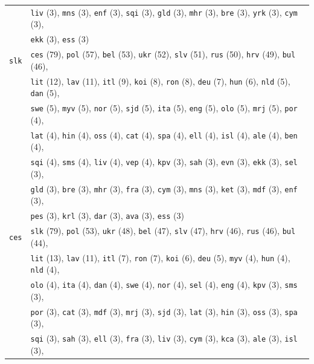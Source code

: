 \begin{center}
\begin{longtable}{ll}
 & \texttt{liv} (3), \texttt{mns} (3), \texttt{enf} (3), \texttt{sqi} (3), \texttt{gld} (3), \texttt{mhr} (3), \texttt{bre} (3), \texttt{yrk} (3), \texttt{cym} (3),\\
 & \texttt{ekk} (3), \texttt{ess} (3) \\
\texttt{slk} & \texttt{ces} (79), \texttt{pol} (57), \texttt{bel} (53), \texttt{ukr} (52), \texttt{slv} (51), \texttt{rus} (50), \texttt{hrv} (49), \texttt{bul} (46),\\
 & \texttt{lit} (12), \texttt{lav} (11), \texttt{itl} (9), \texttt{koi} (8), \texttt{ron} (8), \texttt{deu} (7), \texttt{hun} (6), \texttt{nld} (5), \texttt{dan} (5),\\
 & \texttt{swe} (5), \texttt{myv} (5), \texttt{nor} (5), \texttt{sjd} (5), \texttt{ita} (5), \texttt{eng} (5), \texttt{olo} (5), \texttt{mrj} (5), \texttt{por} (4),\\
 & \texttt{lat} (4), \texttt{hin} (4), \texttt{oss} (4), \texttt{cat} (4), \texttt{spa} (4), \texttt{ell} (4), \texttt{isl} (4), \texttt{ale} (4), \texttt{ben} (4),\\
 & \texttt{sqi} (4), \texttt{sms} (4), \texttt{liv} (4), \texttt{vep} (4), \texttt{kpv} (3), \texttt{sah} (3), \texttt{evn} (3), \texttt{ekk} (3), \texttt{sel} (3),\\
 & \texttt{gld} (3), \texttt{bre} (3), \texttt{mhr} (3), \texttt{fra} (3), \texttt{cym} (3), \texttt{mns} (3), \texttt{ket} (3), \texttt{mdf} (3), \texttt{enf} (3),\\
 & \texttt{pes} (3), \texttt{krl} (3), \texttt{dar} (3), \texttt{ava} (3), \texttt{ess} (3) \\
\texttt{ces} & \texttt{slk} (79), \texttt{pol} (53), \texttt{ukr} (48), \texttt{bel} (47), \texttt{slv} (47), \texttt{hrv} (46), \texttt{rus} (46), \texttt{bul} (44),\\
 & \texttt{lit} (13), \texttt{lav} (11), \texttt{itl} (7), \texttt{ron} (7), \texttt{koi} (6), \texttt{deu} (5), \texttt{myv} (4), \texttt{hun} (4), \texttt{nld} (4),\\
 & \texttt{olo} (4), \texttt{ita} (4), \texttt{dan} (4), \texttt{swe} (4), \texttt{nor} (4), \texttt{sel} (4), \texttt{eng} (4), \texttt{kpv} (3), \texttt{sms} (3),\\
 & \texttt{por} (3), \texttt{cat} (3), \texttt{mdf} (3), \texttt{mrj} (3), \texttt{sjd} (3), \texttt{lat} (3), \texttt{hin} (3), \texttt{oss} (3), \texttt{spa} (3),\\
 & \texttt{sqi} (3), \texttt{sah} (3), \texttt{ell} (3), \texttt{fra} (3), \texttt{liv} (3), \texttt{cym} (3), \texttt{kca} (3), \texttt{ale} (3), \texttt{isl} (3),\\

\end{longtable}
\end{center}
